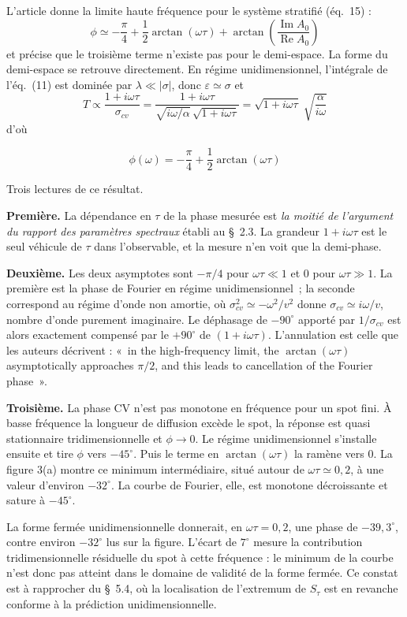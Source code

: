 \documentclass[11pt,a4paper]{article}
\newenvironment{encadre}{\par\smallskip\begin{shaded}\vspace{-6pt}}{\vspace{-6pt}\end{shaded}\par\smallskip}
\begin{document}
L'article donne la limite haute fréquence pour le système stratifié (éq.~15) :
\[
\phi \simeq -\frac{\pi}{4} + \frac{1}{2}\arctan(\omega\tau)
+ \arctan\!\left(\frac{\operatorname{Im}A_0}{\operatorname{Re}A_0}\right)
\]
et précise que le troisième terme n'existe pas pour le demi-espace. La forme du demi-espace se
retrouve directement. En régime unidimensionnel, l'intégrale de l'éq.~(11) est dominée par
$\lambda \ll |\sigma|$, donc $\varepsilon \simeq \sigma$ et
\[
T \propto \frac{1+i\omega\tau}{\sigma_{cv}}
= \frac{1+i\omega\tau}{\sqrt{i\omega/\alpha}\,\sqrt{1+i\omega\tau}}
= \sqrt{1+i\omega\tau}\;\sqrt{\frac{\alpha}{i\omega}}
\]
d'où
\begin{encadre}
\[
\phi(\omega) = -\frac{\pi}{4} + \frac{1}{2}\arctan(\omega\tau)
\]
\end{encadre}

Trois lectures de ce résultat.

\textbf{Première.} La dépendance en $\tau$ de la phase mesurée est \textit{la moitié de
l'argument du rapport des paramètres spectraux} établi au §~2.3. La grandeur $1+i\omega\tau$ est
le seul véhicule de $\tau$ dans l'observable, et la mesure n'en voit que la demi-phase.

\textbf{Deuxième.} Les deux asymptotes sont $-\pi/4$ pour $\omega\tau \ll 1$ et $0$ pour
$\omega\tau \gg 1$. La première est la phase de Fourier en régime unidimensionnel~; la seconde
correspond au régime d'onde non amortie, où $\sigma_{cv}^2 \simeq -\omega^2/v^2$ donne
$\sigma_{cv} \simeq i\omega/v$, nombre d'onde purement imaginaire. Le déphasage de $-90^\circ$
apporté par $1/\sigma_{cv}$ est alors exactement compensé par le $+90^\circ$ de
$(1+i\omega\tau)$. L'annulation est celle que les auteurs décrivent : «~in the high-frequency
limit, the $\arctan(\omega\tau)$ asymptotically approaches $\pi/2$, and this leads to
cancellation of the Fourier phase~».

\textbf{Troisième.} La phase CV n'est pas monotone en fréquence pour un spot fini. À basse
fréquence la longueur de diffusion excède le spot, la réponse est quasi stationnaire
tridimensionnelle et $\phi \to 0$. Le régime unidimensionnel s'installe ensuite et tire $\phi$
vers $-45^\circ$. Puis le terme en $\arctan(\omega\tau)$ la ramène vers $0$. La figure 3(a)
montre ce minimum intermédiaire, situé autour de $\omega\tau \simeq 0{,}2$, à une valeur
d'environ $-32^\circ$. La courbe de Fourier, elle, est monotone décroissante et sature à
$-45^\circ$.

La forme fermée unidimensionnelle donnerait, en $\omega\tau = 0{,}2$, une phase de
$-39{,}3^\circ$, contre environ $-32^\circ$ lus sur la figure. L'écart de $7^\circ$ mesure la
contribution tridimensionnelle résiduelle du spot à cette fréquence : le minimum de la courbe
n'est donc pas atteint dans le domaine de validité de la forme fermée. Ce constat est à
rapprocher du §~5.4, où la localisation de l'extremum de $S_\tau$ est en revanche conforme à la
prédiction unidimensionnelle.
\end{document}
